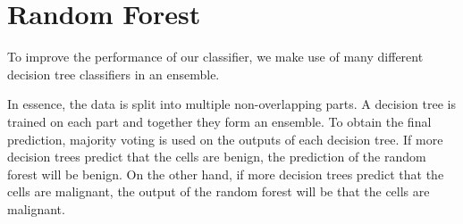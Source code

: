 \section{Random Forest}
To improve the performance of our classifier, we make use of many different decision tree classifiers in an ensemble.



In essence, the data is split into multiple non-overlapping parts. A decision tree is trained on each part and together they form an ensemble. To obtain the final prediction, majority voting is used on the outputs of each decision tree. If more decision trees predict that the cells are benign, the prediction of the random forest will be benign. On the other hand, if more decision trees predict that the cells are malignant, the output of the random forest will be that the cells are malignant. \\

